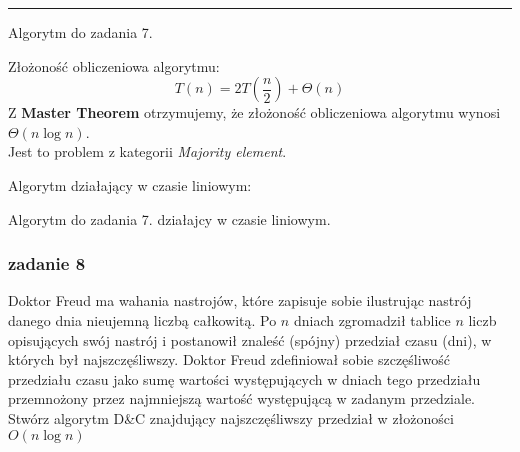 \documentclass[11pt,a4paper]{article}
\begin{document}
\bigskip
\hrule
\bigskip

\begin{algorithm}[H]
    \caption{Algorytm do zadania 7.}
    \begin{algorithmic}[1]
        \State {}
        \EndIf
        \State {}
        \EndIf
        \State {}
        \Else
        \State {}
        \EndIf
        \EndProcedure
    \end{algorithmic}
\end{algorithm}

Złożoność obliczeniowa algorytmu:
\[
    T(n) = 2T\left(\frac{n}{2}\right) + \Theta(n)
\]
Z \textbf{Master Theorem} otrzymujemy, że złożoność obliczeniowa algorytmu wynosi $\Theta(n \log n)$.\\
Jest to problem z kategorii \textit{Majority element}.

Algorytm działający w czasie liniowym:
\begin{algorithm}[H]
    \caption{Algorytm do zadania 7. działajcy w czasie liniowym.}
    \begin{algorithmic}[1]
            \EndIf
            \Else
            \EndIf
        \EndFor
        \State {}
        \EndProcedure
    \end{algorithmic}
\end{algorithm}

\subsubsection{zadanie 8}
Doktor Freud ma wahania nastrojów, które zapisuje sobie ilustrując nastrój danego dnia nieujemną liczbą całkowitą. Po $n$ dniach zgromadził tablice $n$ liczb opisujących swój nastrój i postanowił znaleść (spójny) przedział czasu (dni), w których był najszczęśliwszy. Doktor Freud zdefiniował sobie szczęśliwość przedziału czasu jako sumę wartości występujących w dniach tego przedziału przemnożony przez najmniejszą wartość występującą w zadanym przedziale. Stwórz algorytm D\&C znajdujący najszczęśliwszy przedział w złożoności $O(n \log n)$
\end{document}
